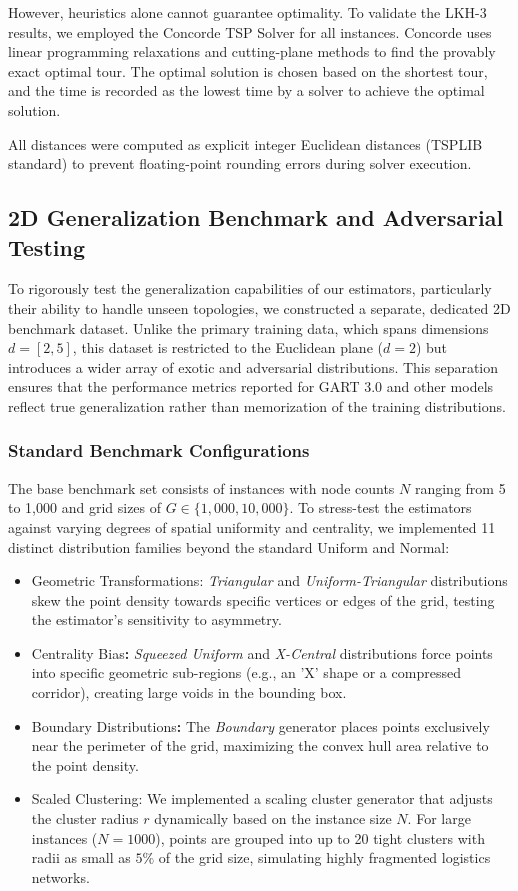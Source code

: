 \documentclass{article}
\begin{document}
However, heuristics alone cannot guarantee optimality. To validate the LKH-3 results, we employed the Concorde TSP Solver \cite{concorde2006} for all  instances. Concorde uses linear programming relaxations and cutting-plane methods to find the provably exact optimal tour. The optimal solution is chosen based on the shortest tour, and the time is recorded as the lowest time by a solver to achieve the optimal solution.

All distances were computed as explicit integer Euclidean distances (TSPLIB standard) to prevent floating-point rounding errors during solver execution.
\subsection{2D Generalization Benchmark and Adversarial Testing}
\label{subsec:2d_benchmark}

To rigorously test the generalization capabilities of our estimators, particularly their ability to handle unseen topologies, we constructed a separate, dedicated 2D benchmark dataset. Unlike the primary training data, which spans dimensions $d=[2,5]$, this dataset is restricted to the Euclidean plane ($d=2$) but introduces a wider array of exotic and adversarial distributions. This separation ensures that the performance metrics reported for GART 3.0 and other models reflect true generalization rather than memorization of the training distributions.

\subsubsection{Standard Benchmark Configurations}
The base benchmark set consists of instances with node counts $N$ ranging from 5 to 1,000 and grid sizes of $G \in \{1,000, 10,000\}$. To stress-test the estimators against varying degrees of spatial uniformity and centrality, we implemented 11 distinct distribution families beyond the standard Uniform and Normal:

\begin{itemize}
    \item Geometric Transformations: \textit{Triangular} and \textit{Uniform-Triangular} distributions skew the point density towards specific vertices or edges of the grid, testing the estimator's sensitivity to asymmetry.
    \item Centrality Bias\textbf{:} \textit{Squeezed Uniform} and \textit{X-Central} distributions force points into specific geometric sub-regions (e.g., an 'X' shape or a compressed corridor), creating large voids in the bounding box.
    \item Boundary Distributions\textbf{:} The \textit{Boundary} generator places points exclusively near the perimeter of the grid, maximizing the convex hull area relative to the point density.
    \item Scaled Clustering: We implemented a scaling cluster generator that adjusts the cluster radius $r$ dynamically based on the instance size $N$. For large instances ($N=1000$), points are grouped into up to 20 tight clusters with radii as small as $5\%$ of the grid size, simulating highly fragmented logistics networks.
\end{itemize}
\end{document}
